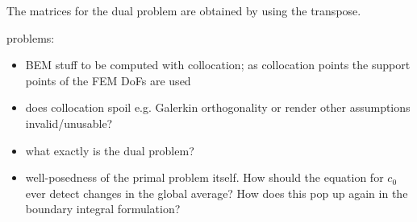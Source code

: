 \documentclass[runningheads]{lncse}
\begin{document}
The matrices for the dual problem are obtained by using the transpose.

problems:
\begin{itemize}
\item BEM stuff to be computed with collocation; as collocation points the support points of the FEM DoFs are used
\item does collocation spoil e.g. Galerkin orthogonality or render other assumptions invalid/unusable?
\item what exactly is the dual problem?
\item well-posedness of the primal problem itself. How should the equation for $c_0$ ever detect changes in the global average? How does this pop up again in the boundary integral formulation?
\end{itemize}
\newpage









%
%  
%
\end{document}
